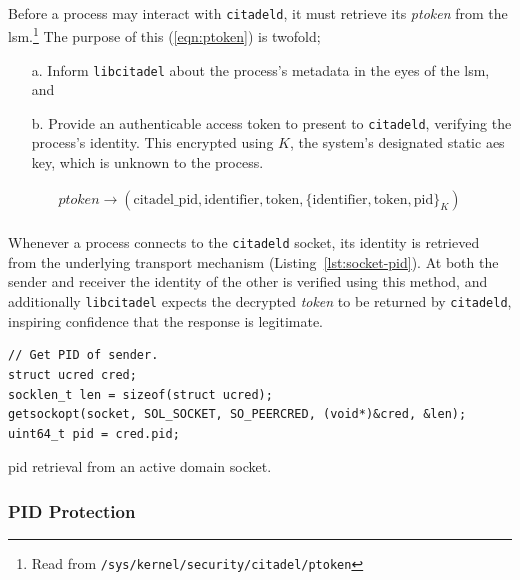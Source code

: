 \paragraph{} Before a process may interact with \texttt{citadeld}, it must retrieve its \textit{ptoken} from the \acrshort{lsm}.\footnote{Read from \texttt{/sys/kernel/security/citadel/ptoken}} The purpose of this (\ref{eqn:ptoken}) is twofold;
\begin{enumerate}
    \item[a.] Inform \texttt{libcitadel} about the process's metadata in the eyes of the \acrshort{lsm}, and
    \item[b.] Provide an authenticable access token to present to \texttt{citadeld}, verifying the process's identity. This encrypted using $K$, the system's designated static \acrshort{aes} key, which is unknown to the process. 
\end{enumerate}

\vspace{-7mm}
\begin{align}
    \textit{ptoken} \rightarrow ( \text{citadel\_pid}, \text{identifier}, \text{token}, \{\text{identifier}, \text{token}, \text{pid}\}_K) \label{eqn:ptoken}
\end{align}

\paragraph{} Whenever a process connects to the \texttt{citadeld} socket, its identity is retrieved from the underlying transport mechanism (Listing~\ref{lst:socket-pid}). At both the sender and receiver the identity of the other is verified using this method, and additionally \texttt{libcitadel} expects the decrypted \textit{token} to be returned by \texttt{citadeld}, inspiring confidence that the response is legitimate.

\begin{listing}
\begin{verbatim}
// Get PID of sender.
struct ucred cred;
socklen_t len = sizeof(struct ucred);
getsockopt(socket, SOL_SOCKET, SO_PEERCRED, (void*)&cred, &len);
uint64_t pid = cred.pid;
\end{verbatim}
\vspace{3mm}
\caption[PID retrieval from an active domain socket.]{\acrshort{pid} retrieval from an active domain socket.}
\label{lst:socket-pid}
\end{listing}

\subsubsection{PID Protection}
\label{sec:pid-protection}
